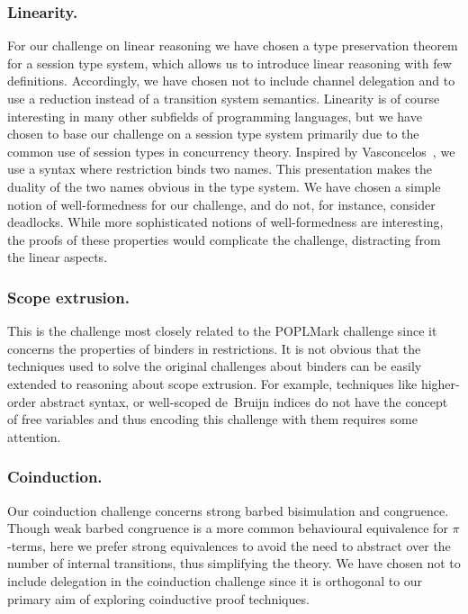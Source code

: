 \documentclass[runningheads]{llncs}
\begin{document}
\subsubsection{Linearity.}
For our challenge on linear reasoning we have chosen a type preservation theorem
for a session type system, which allows us to introduce linear
reasoning with few definitions. Accordingly, we have chosen not to
include channel delegation and to use a reduction instead of a
transition system semantics.
Linearity is of course interesting in many other subfields of programming languages, but we have chosen to base our challenge on a session type system primarily due to the common use of session types in concurrency theory.
Inspired by Vasconcelos~\cite{Vasconcelos2012}, we use a syntax where
restriction binds two names. This presentation makes the duality
of the two names obvious in the type system.
We have chosen a simple notion of well-formedness for our challenge,
and do not, for instance, consider deadlocks. While more
sophisticated notions of well-formedness are interesting, the
proofs of these properties would complicate the challenge, distracting from the linear aspects.

\subsubsection{Scope extrusion.}
This is the challenge most closely related to the POPLMark
challenge since it concerns the properties of binders in restrictions.
It is not obvious that the techniques used to solve the original challenges about binders can be easily extended to reasoning about scope extrusion.
For example, techniques like higher-order abstract syntax, or well-scoped
de\ Bruijn indices do not have the concept of free variables and thus encoding this challenge with them requires some attention.

\subsubsection{Coinduction.}

Our coinduction challenge concerns strong barbed bisimulation and congruence.
Though weak barbed congruence is a more common behavioural equivalence for \(\pi\)-terms, here we prefer strong equivalences to avoid the need to abstract over the number of internal transitions, %
thus simplifying the theory.
We have chosen not to include delegation in the coinduction challenge since it is orthogonal to our primary aim of exploring coinductive proof techniques.
\end{document}
